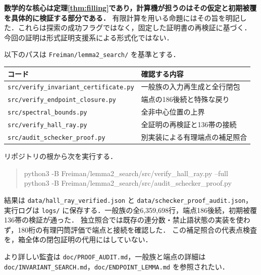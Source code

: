 \documentclass[10pt,a4paper]{article}
\theoremstyle{definition}
\newcommand{\file}[1]{{\small\nolinkurl{#1}}}
\begin{document}
\textbf{数学的な核心は定理\ref{thm:filling}であり，計算機が担うのはその仮定と初期被覆を具体的に検証する部分である．}
有限計算を用いる命題にはその旨を明記した．これらは探索の成功フラグではなく，固定した証明書の再検証に基づく．
今回の証明は形式証明支援系による形式化ではない．

以下のパスは \file{Freiman/lemma2_search/} を基準とする．
\begin{center}\small
\begin{tabular}{p{.49\linewidth}p{.41\linewidth}}
\toprule
コード & 確認する内容\\\midrule
\file{src/verify_invariant_certificate.py} & 一般族の入力再生成と全行閉包\\
\file{src/verify_endpoint_closure.py} & 端点の186後続と特殊な戻り\\
\file{src/spectral_bounds.py} & 全非中心位置の上界\\
\file{src/verify_hall_ray.py} & 全証明の再検証と136帯の接続\\
\file{src/audit_schecker_proof.py} & 別実装による有理端点の補足照合\\\bottomrule
\end{tabular}
\end{center}

リポジトリの根から次を実行する．
\begin{quote}\small\ttfamily
python3 -B Freiman/lemma2\_search/src/verify\_hall\_ray.py --full\\
python3 -B Freiman/lemma2\_search/src/audit\_schecker\_proof.py
\end{quote}
結果は \file{data/hall_ray_verified.json} と \file{data/schecker_proof_audit.json}，
実行ログは \file{logs/} に保存する．一般族の全6,359,698行，端点186後続，初期被覆136帯の検証が通った．
独立照合では既存の連分数・禁止語状態の実装を使わず，180桁の有理円筒評価で端点と接続を確認した．
この補足照合の代表点検査を，箱全体の閉包証明の代用にはしていない．

より詳しい監査は \file{doc/PROOF_AUDIT.md}，一般族と端点の詳細は
\file{doc/INVARIANT_SEARCH.md}，\file{doc/ENDPOINT_LEMMA.md} を参照されたい．
\end{document}
